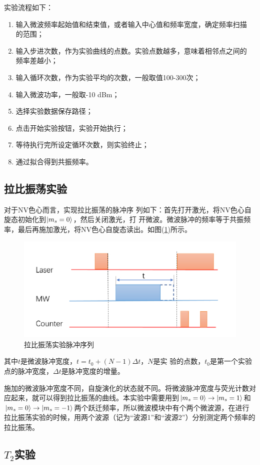 \documentclass[a4paper]{article}
\begin{document}
实验流程如下：
\begin{enumerate}
	\item 输入微波频率起始值和结束值，或者输入中心值和频率宽度，确定频率扫描
	的范围；
	\item 输入步进次数，作为实验曲线的点数。实验点数越多，意味着相邻点之间的
	频率差越小；
	\item 输入循环次数，作为实验平均的次数，一般取值100-300次；
	\item 输入微波功率，一般取-10 dBm；
	\item 选择实验数据保存路径；
	\item 点击开始实验按钮，实验开始执行；
	\item 等待执行完所设定循环次数，则实验终止；
	\item 通过拟合得到共振频率。
\end{enumerate}


\subsection{拉比振荡实验}
对于NV色心而言，实现拉比振荡的脉冲序
列如下：首先打开激光，将NV色心自旋态初始化到$ \ket{m_s=0} $，然后关闭激光，打
开微波。微波脉冲的频率等于共振频率，最后再施加激光，将NV色心自旋态读出。如图(\ref{fig:rabip})所示。
\begin{figure}[H]
	\centering
	\includegraphics[width=0.7\linewidth]{fig/rabipulse.jpg}
	\caption{拉比振荡实验脉冲序列}
	\label{fig:rabip}
\end{figure}
其中$ t  $是微波脉冲宽度，$ t = t_0 + (N - 1)\Delta t $，$ N $是实
验的点数，$ t_0  $是第一个实验点的脉冲宽度，$ \Delta t  $是脉冲宽度的增量。

施加的微波脉冲宽度不同，自旋演化的状态就不同。将微波脉冲宽度与荧光计数对
应起来，就可以得到拉比振荡的曲线。本实验中需要用到$ \ket{m_s=0} \rightarrow \ket{m_s=1} $和$ \ket{m_s=0} \rightarrow \ket{m_s=-1} $两个跃迁频率，所以微波模块中有个两个微波源，在进行拉比振荡实验的时候，用两个波源（记为“波源1”和“波源2”）分别测定两个频率的拉比振荡。

\subsection{$ T_2 $实验}
\end{document}
